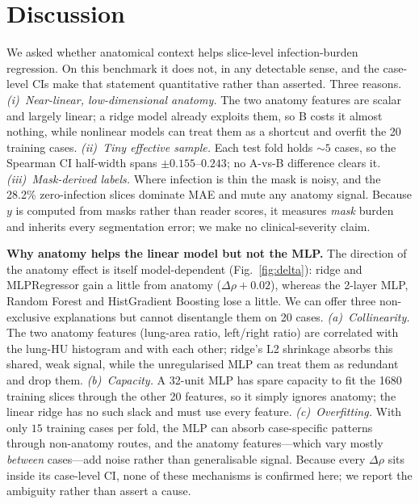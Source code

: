\documentclass[conference]{IEEEtran}
\begin{document}
\section{Discussion}
We asked whether anatomical context helps slice-level infection-burden
regression. On this benchmark it does not, in any detectable sense, and the
case-level CIs make that statement quantitative rather than asserted. Three
reasons. \emph{(i)~Near-linear, low-dimensional anatomy.} The two anatomy
features are scalar and largely linear; a ridge model already exploits them, so
B costs it almost nothing, while nonlinear models can treat them as a shortcut
and overfit the 20 training cases. \emph{(ii)~Tiny effective sample.} Each test
fold holds $\sim5$ cases, so the Spearman CI half-width spans $\pm0.155$--$0.243$; no
A-vs-B difference clears it. \emph{(iii)~Mask-derived labels.} Where infection is
thin the mask is noisy, and the 28.2\% zero-infection slices dominate MAE and
mute any anatomy signal. Because $y$ is computed from masks rather than reader
scores, it measures \emph{mask} burden and inherits every segmentation error; we
make no clinical-severity claim.

\textbf{Why anatomy helps the linear model but not the MLP.} The direction of the
anatomy effect is itself model-dependent (Fig.~\ref{fig:delta}): ridge and
MLPRegressor gain a little from anatomy ($\Delta\rho{+}0.02$), whereas the
2-layer MLP, Random Forest and HistGradient Boosting lose a little. We can offer
three non-exclusive explanations but cannot disentangle them on 20 cases.
\emph{(a)~Collinearity.} The two anatomy features (lung-area ratio, left/right
ratio) are correlated with the lung-HU histogram and with each other; ridge's L2
shrinkage absorbs this shared, weak signal, while the unregularised MLP can treat
them as redundant and drop them. \emph{(b)~Capacity.} A 32-unit MLP has spare
capacity to fit the 1680 training slices through the other 20 features, so it
simply ignores anatomy; the linear ridge has no such slack and must use every
feature. \emph{(c)~Overfitting.} With only $15$ training cases per fold, the
MLP can absorb case-specific patterns through non-anatomy routes, and the anatomy
features---which vary mostly \emph{between} cases---add noise rather than
generalisable signal. Because every $\Delta\rho$ sits inside its case-level CI,
none of these mechanisms is confirmed here; we report the ambiguity rather than
assert a cause.
\end{document}

